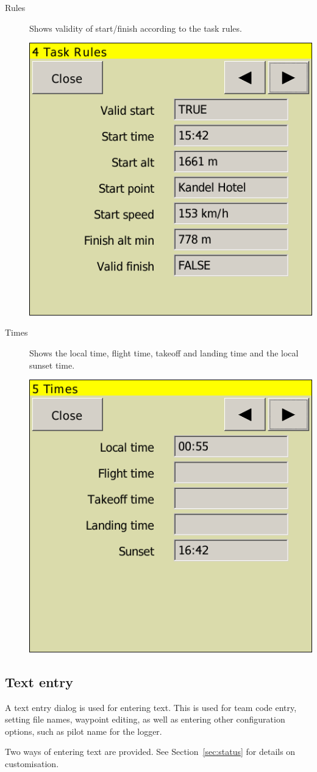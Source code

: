 \begin{description}
\item[Rules] Shows validity of start/finish according to the task rules.
\begin{center}
\includegraphics[angle=0,width=0.5\linewidth,keepaspectratio='true']{figures/status-rules.png}
\end{center}

\item[Times]  Shows the local time, flight time, takeoff and landing time and
the local sunset time.
\begin{center}
\includegraphics[angle=0,width=0.5\linewidth,keepaspectratio='true']{figures/status-times.png}
\end{center}
\end{description}

\subsection*{Text entry} \label{sec:textentry}
A text entry dialog is used for entering text.  This is used for team
code entry, setting file names, waypoint editing, as well as entering
other configuration options, such as pilot name for the logger.

Two ways of entering text are provided. See Section~\ref{sec:status} for details on customisation.

